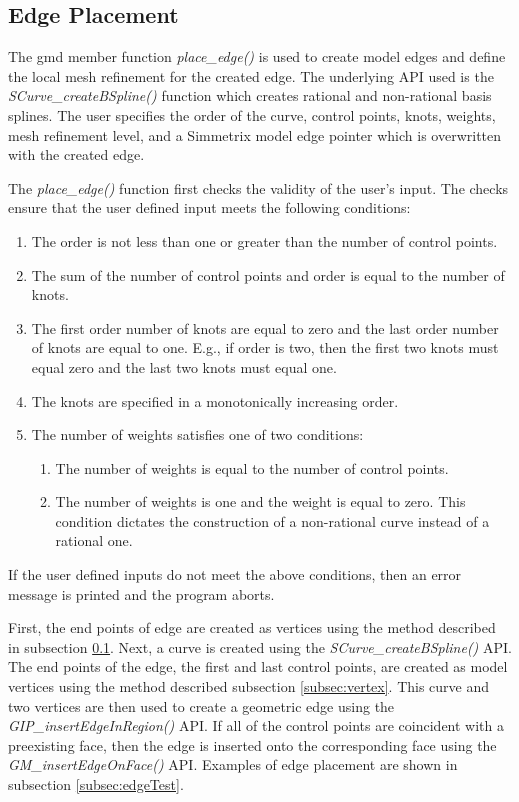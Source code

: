 \documentclass[a4paper, 12pt]{article}
\begin{document}
\subsection{Edge Placement} \label{subsec:edge}
The gmd member function \emph{place\_edge()} is used
to create model edges and define the local mesh refinement 
for the created edge.  The underlying API used
is the \emph{SCurve\_createBSpline()} function which 
creates rational and non-rational
basis splines. The user specifies the order of the curve, 
control points, knots,
weights, mesh refinement level, and a Simmetrix model 
edge pointer which is 
overwritten with the created edge. 

The \emph{place\_edge()} function first checks the 
validity of the user's input.
The checks ensure that the user defined input meets 
the following conditions:
\begin{enumerate}
  \item The order is not less than one or greater than the number 
      of control points.
  \item The sum of the number of control points and order is equal to 
      the number of knots.
  \item The first order number of knots are equal to zero and 
      the last order number 
      of knots are equal to one. E.g., if order is two, then the first two 
      knots must equal zero and the last two knots must equal one.
  \item The knots are specified in a monotonically increasing order. 
  \item The number of weights satisfies one of two conditions:
    \begin{enumerate}
      \item The number of weights is equal to the number of control points.
      \item The number of weights is one and the weight is equal to zero. 
          This condition dictates the construction of a non-rational curve
          instead of a rational one.
    \end{enumerate}
\end{enumerate}

If the user defined inputs do not meet the above conditions, then an error 
message is printed and the program aborts.

First, the end points of edge are created as vertices using the 
method described in subsection \ref{subsec:edge}. Next, a curve
is created using the \emph{SCurve\_createBSpline()} API. 
The end points of the edge, the first and last control points, 
are created as model vertices using the method described 
subsection \ref{subsec:vertex}.
This curve and two vertices are then used to create a geometric edge using the 
\emph{GIP\_insertEdgeInRegion()} API. If all of the 
control points are coincident with a preexisting face, then the
edge is inserted onto the corresponding face using the 
\emph{GM\_insertEdgeOnFace()} API. Examples of edge placement
are shown in subsection \ref{subsec:edgeTest}.
\end{document}
